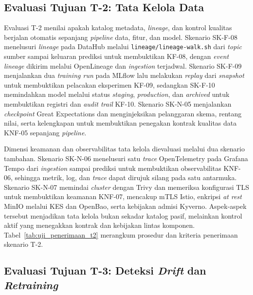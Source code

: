 

\subsection{Evaluasi Tujuan T-2: Tata Kelola Data}
\label{subsec:metode-t2}

Evaluasi T-2 menilai apakah katalog metadata, \textit{lineage}, dan kontrol kualitas berjalan otomatis sepanjang \textit{pipeline} data, fitur, dan model. Skenario SK-F-08 menelusuri \textit{lineage} pada DataHub melalui \texttt{lineage/}\allowbreak\texttt{lineage-walk.sh} dari \textit{topic} sumber sampai keluaran prediksi untuk membuktikan KF-08, dengan \textit{event} \textit{lineage} dikirim melalui OpenLineage dan \textit{ingestion} terjadwal. Skenario SK-F-09 menjalankan dua \textit{training run} pada MLflow lalu melakukan \textit{replay} dari \textit{snapshot} untuk membuktikan pelacakan eksperimen KF-09, sedangkan SK-F-10 memindahkan model melalui status \textit{staging}, \textit{production}, dan \textit{archived} untuk membuktikan registri dan \textit{audit trail} KF-10. Skenario SK-N-05 menjalankan \textit{checkpoint} Great Expectations dan menginjeksikan pelanggaran skema, rentang nilai, serta kelengkapan untuk membuktikan penegakan kontrak kualitas data KNF-05 sepanjang \textit{pipeline}.

Dimensi keamanan dan observabilitas tata kelola dievaluasi melalui dua skenario tambahan. Skenario SK-N-06 menelusuri satu \textit{trace} OpenTelemetry pada Grafana Tempo dari \textit{ingestion} sampai prediksi untuk membuktikan observabilitas KNF-06, sehingga metrik, log, dan \textit{trace} dapat dirujuk silang pada satu antarmuka. Skenario SK-N-07 memindai \textit{cluster} dengan Trivy dan memeriksa konfigurasi TLS untuk membuktikan keamanan KNF-07, mencakup mTLS Istio, enkripsi \textit{at rest} MinIO melalui KES dan OpenBao, serta kebijakan admisi Kyverno. Aspek-aspek tersebut menjadikan tata kelola bukan sekadar katalog pasif, melainkan kontrol aktif yang menegakkan kontrak dan kebijakan lintas komponen. Tabel~\ref{tab:uji_penerimaan_t2} merangkum prosedur dan kriteria penerimaan skenario T-2.



\subsection{Evaluasi Tujuan T-3: Deteksi \textit{Drift} dan \textit{Retraining}}
\label{subsec:metode-t3}

